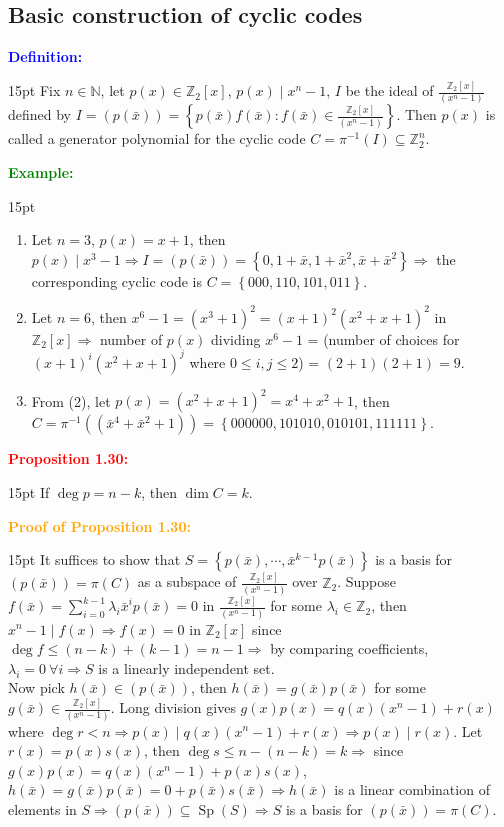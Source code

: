 \documentclass[12pt]{article}
\newcommand{\noparskip}{\vspace{-\parskip}}
\newenvironment{points}
	{\begin{enumerate}[label = (\arabic*)]}
	{\end{enumerate}}
\newenvironment{dent}
	{\begin{adjustwidth}{15pt}{}\noparskip}
	{\end{adjustwidth}}
\newenvironment{result}[1]
	{\textcolor{Red}{\textbf{#1:}}\begin{dent}}
	{\end{dent}}
\newenvironment{proof}[1]
	{\textcolor{Orange}{\textbf{Proof of #1:}}\begin{dent}}
	{\end{dent}}
\newenvironment{definition}
	{\textcolor{Blue}{\textbf{Definition:}}\begin{dent}}
	{\end{dent}}
\newenvironment{example}
	{\textcolor{Green}{\textbf{Example:}}\begin{dent}}
	{\end{dent}}
\renewcommand{\implies}{\Rightarrow}
\newcommand{\set}[1]{\left\{ #1 \right\}}
\newcommand{\Z}{\mathbb{Z}}
\newcommand{\N}{\mathbb{N}}
\newcommand{\Ztwox}{\Z_2[x]}
\newcommand{\gen}[1]{\left( #1 \right)}
\newcommand{\Ztwoxgen}[1]{\frac{\Ztwox}{\gen{#1}}}
\newcommand{\xbar}{\bar{x}}
\renewcommand{\span}[1]{\operatorname{Sp}(#1)}
\begin{document}
\subsection{Basic construction of cyclic codes}

\begin{definition}
Fix $n \in \N$, let $p(x) \in \Ztwox$, $p(x) \mid x^n - 1$, $I$ be the ideal of $\Ztwoxgen{x^n - 1}$ defined by $I = \gen{p(\xbar)} = \set{p(\xbar)f(\xbar): f(\xbar) \in \Ztwoxgen{x^n - 1}}$. Then $p(x)$ is called a generator polynomial for the cyclic code $C = \pi^{-1}(I) \subseteq \Z_2^n$.
\end{definition}

\begin{example}
\begin{points}
\item Let $n = 3$, $p(x) = x + 1$, then $p(x) \mid x^3 - 1 \implies I = \gen{p(\xbar)} = \set{0, 1 + \xbar, 1 + \xbar^2, \xbar + \xbar^2} \implies$ the corresponding cyclic code is $C = \set{000, 110, 101, 011}$.
\item Let $n = 6$, then $x^6 - 1 = (x^3 + 1)^2 = (x + 1)^2 (x^2 + x + 1)^2$ in $\Ztwox \implies$ number of $p(x)$ dividing $x^6 - 1$ = (number of choices for $(x + 1)^i (x^2 + x + 1)^j$ where $0 \le i, j \le 2$) = $(2 + 1)(2 + 1) = 9$.
\item From (2), let $p(x) = (x^2 + x + 1)^2 = x^4 + x^2 + 1$, then $C = \pi^{-1}\left( \gen{\xbar^4 + \xbar^2 + 1} \right) = \set{000000, 101010, 010101, 111111}$.
\end{points}
\end{example}

\begin{result}{Proposition 1.30}
If $\deg p = n - k$, then $\dim C = k$.
\end{result}

\begin{proof}{Proposition 1.30}
It suffices to show that $S = \set{p(\xbar), \cdots, \xbar^{k - 1} p(\xbar)}$ is a basis for $\gen{p(\xbar)} = \pi(C)$ as a subspace of $\Ztwoxgen{x^n - 1}$ over $\Z_2$. Suppose $f(\xbar) = \sum_{i = 0}^{k - 1} \lambda_i \xbar^i p(\xbar) = 0$ in $\Ztwoxgen{x^n - 1}$ for some $\lambda_i \in \Z_2$, then $x^n - 1 \mid f(x) \implies f(x) = 0$ in $\Ztwox$ since $\deg f \le (n - k) + (k - 1) = n - 1 \implies$ by comparing coefficients, $\lambda_i = 0\ \forall i \implies S$ is a linearly independent set. \\
Now pick $h(\xbar) \in \gen{p(\xbar)}$, then $h(\xbar) = g(\xbar)p(\xbar)$ for some $g(\xbar) \in \Ztwoxgen{x^n - 1}$. Long division gives $g(x)p(x) = q(x)(x^n - 1) + r(x)$ where $\deg r < n \implies p(x) \mid q(x)(x^n - 1) + r(x) \implies p(x) \mid r(x)$. Let $r(x) = p(x)s(x)$, then $\deg s \le n - (n - k) = k \implies$ since $g(x)p(x) = q(x)(x^n - 1) + p(x)s(x)$, $h(\xbar) = g(\xbar)p(\xbar) = 0 + p(\xbar)s(\xbar) \implies h(\xbar)$ is a linear combination of elements in $S \implies \gen{p(\xbar)} \subseteq \span{S} \implies S$ is a basis for $\gen{p(\xbar)} = \pi(C)$.
\end{proof}
\end{document}
